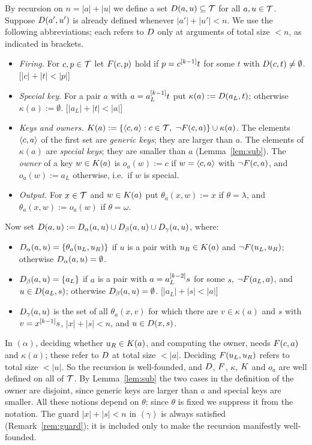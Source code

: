 \begin{definition}\label{def:D}
By recursion on $n=|a|+|u|$ we define a set $D(a,u)\subseteq\mathcal{T}$ for all
$a,u\in\mathcal{T}$. Suppose $D(a',u')$ is already defined whenever $|a'|+|u'|<n$.
We use the following abbreviations; each refers to $D$ only at arguments of
total size $<n$, as indicated in brackets.
\begin{itemize}
\item \emph{Firing.} For $c,p\in\mathcal{T}$ let $F(c,p)$ hold if
  $p=c^{[k-1]}t$ for some $t$ with $D(c,t)\neq\emptyset$.
  \hfill[$|c|+|t|<|p|$]
\item \emph{Special key.} For a pair $a$ with $a=a_L^{[k-1]}t$ put
  $\kappa(a):=D(a_L,t)$; otherwise $\kappa(a):=\emptyset$.
  \hfill[$|a_L|+|t|<|a|$]
\item \emph{Keys and owners.}
  $\Key(a):=\{\pr{c}{a}: c\in\T,\ \neg\Fire(c,a)\}\cup\kappa(a)$. The elements
  $\langle c,a\rangle$ of the first set are \emph{generic keys}; they are larger than
  $a$. The elements of $\kappa(a)$ are \emph{special keys}; they are smaller
  than $a$ (Lemma~\ref{lem:sub}). The \emph{owner} of a key $w\in K(a)$ is
  $o_a(w):=c$ if $w=\langle c,a\rangle$ with $\neg F(c,a)$, and $o_a(w):=a_L$
  otherwise, i.e.\ if $w$ is special.
\item \emph{Output.} For $x\in\mathcal{T}$ and $w\in K(a)$ put
  $\theta_a(x,w):=x$ if $\theta=\lambda$, and $\theta_a(x,w):=o_a(w)$ if
  $\theta=\omega$.
\end{itemize}
Now set $D(a,u):=D_\alpha(a,u)\cup D_\beta(a,u)\cup D_\gamma(a,u)$,
where:
\begin{itemize}[leftmargin=2.2em]
\item[$(\alpha)$] $D_\alpha(a,u)=\{\theta_a(u_L,u_R)\}$ if $u$ is a pair with
  $u_R\in K(a)$ and $\neg F(u_L,u_R)$; otherwise $D_\alpha(a,u)=\emptyset$.
\item[$(\beta)$] $D_\beta(a,u)=\{a_L\}$ if $a$ is a pair with
  $a=a_L^{[k-2]}s$ for some $s$, $\neg F(a_L,a)$, and
  $u\in D(a_L,s)$; otherwise $D_\beta(a,u)=\emptyset$.
  \hfill[$|a_L|+|s|<|a|$]
\item[$(\gamma)$] $D_\gamma(a,u)$ is the set of all $\theta_a(x,v)$ for which
  there are $v\in\kappa(a)$ and $s$ with $v=x^{[k-1]}s$, $|x|+|s|<n$, and
  $u\in D(x,s)$.
\end{itemize}
\end{definition}

In $(\alpha)$, deciding whether $u_R\in K(a)$, and computing the owner,
needs $F(c,a)$ and $\kappa(a)$; these refer to $D$ at total size $<|a|$.
Deciding $F(u_L,u_R)$ refers to total size $<|u|$. So the recursion is
well-founded, and $D$, $F$, $\kappa$, $K$ and $o_a$ are well defined
on all of $\mathcal{T}$. By Lemma~\ref{lem:sub} the two cases in the definition of the
owner are disjoint, since generic keys are larger than $a$ and special keys are
smaller. All these notions depend on $\theta$; since
$\theta$ is fixed we suppress it from the notation. The guard $|x|+|s|<n$ in
$(\gamma)$ is always satisfied (Remark~\ref{rem:guard}); it is included only to
make the recursion manifestly well-founded.

